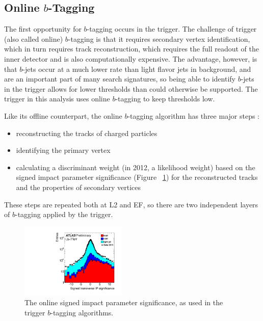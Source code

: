 \subsection{Online $b$-Tagging}
The first opportunity for $b$-tagging occurs in the trigger.  The challenge of trigger (also called online)
$b$-tagging is that it requires secondary vertex identification, which in turn requires track reconstruction,
which requires the full readout of the inner detector and is also computationally expensive.  The advantage,
however, is that $b$-jets occur at a much lower rate than light flavor jets in background, and are an important
part of many search signatures, so being able to identify $b$-jets in the trigger allows for lower
thresholds than could otherwise be supported.  The trigger in this analysis uses online $b$-tagging to keep
thresholds low. 

Like its offline counterpart, the online $b$-tagging algorithm has three major steps \cite{online_btag_2}:
\begin{itemize}
    \item reconstructing the tracks of charged particles
    \item identifying the primary vertex
    \item calculating a discriminant weight (in 2012, a likelihood weight) based on the signed impact parameter significance 
    (Figure ~\ref{fig:ip_sig}) for the reconstructed tracks and the properties of secondary vertices
\end{itemize}

These steps are repeated both at L2 and EF, so there are two independent layers of $b$-tagging applied by the
trigger.

\begin{figure}
    \center
   \includegraphics[width=0.45\textwidth]{ReconstructionPerformance/online_btag_IP.pdf}
   \caption{The online signed impact parameter significance, as used in the trigger $b$-tagging algorithms. \label{fig:ip_sig} }
\end{figure}


